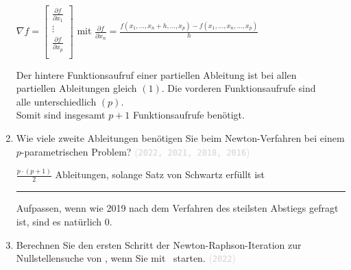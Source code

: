\documentclass[12pt]{article}
\newcommand{\kommentarMacro}[1]{\textcolor{lightgray}{(\texttt{#1})}}
\begin{document}
\begin{enumerate}
          \begin{solution}
              $\nabla f=\begin{bmatrix}
                      \frac{\partial f}{\partial x_1} \\
                      \vdots                          \\
                      \frac{\partial f}{\partial x_p} \\
                  \end{bmatrix}$ mit $\frac{\partial f}{\partial x_n} = \frac{f\left(x_1, ..., x_n + h, ..., x_p\right) - f\left(x_1, ..., x_n, ..., x_p\right)}{h}$

              Der hintere Funktionsaufruf einer partiellen Ableitung ist bei allen \\ partiellen Ableitungen gleich $(1)$. Die vorderen Funktionsaufrufe sind \\ alle unterschiedlich $(p)$. \\
              Somit sind insgesamt $p+1$ Funktionsaufrufe benötigt.
          \end{solution}
    \item Wie viele zweite Ableitungen benötigen Sie beim Newton-Verfahren bei einem $p$-parametrischen Problem? \kommentarMacro{2022, 2021, 2018, 2016}

          \begin{solution}
              $\frac{p\cdot(p+1)}{2}$ Ableitungen, solange Satz von Schwartz erfüllt ist

              \rule{\textwidth}{0.4pt}
              \vspace{0.25cm}

              Aufpassen, wenn wie 2019 nach dem Verfahren des steilsten Abstiegs gefragt ist, sind es natürlich 0.
          \end{solution}

    \item Berechnen Sie den ersten Schritt der Newton-Raphson-Iteration zur Nullstellensuche von \raphsonFunction, wenn Sie mit \raphsonStartVal\, starten. \kommentarMacro{2022}


\end{enumerate}
\end{document}
